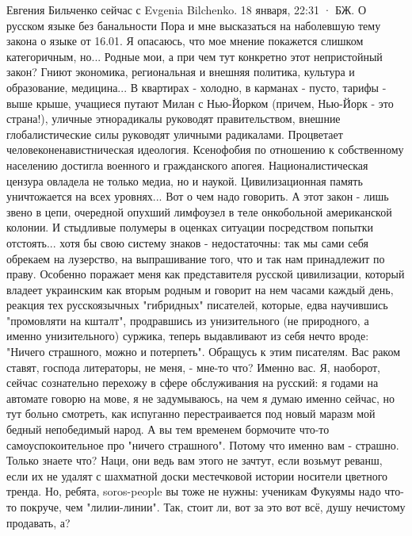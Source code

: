 \documentclass[a4paper,11pt]{extreport}
\begin{document}
Евгения Бильченко сейчас с Evgenia Bilchenko.
18 января, 22:31 ·
БЖ. О русском языке без банальности
Пора и мне высказаться на наболевшую тему закона о языке от 16.01. Я опасаюсь, что мое мнение покажется слишком категоричным, но... Родные мои, а при чем тут конкретно этот непристойный закон? Гниют экономика, региональная и внешняя политика, культура и образование, медицина... В квартирах - холодно, в карманах - пусто, тарифы - выше крыше, учащиеся путают Милан с Нью-Йорком (причем, Нью-Йорк - это страна!), уличные этнорадикалы руководят правительством, внешние глобалистические силы руководят уличными радикалами.
Процветает человеконенавистническая идеология. Ксенофобия по отношению к собственному населению достигла военного и гражданского апогея. Националистическая цензура овладела не только медиа, но и наукой. Цивилизационная память уничтожается на всех уровнях...
Вот о чем надо говорить. А этот закон - лишь звено в цепи, очередной опухший лимфоузел в теле онкобольной американской колонии. И стыдливые полумеры в оценках ситуации посредством попытки отстоять... хотя бы свою систему знаков - недостаточны: так мы сами себя обрекаем на лузерство, на выпрашивание того, что и так нам принадлежит по праву.
Особенно поражает меня как представителя русской цивилизации, который владеет украинским как вторым родным и говорит на нем часами каждый день, реакция тех русскоязычных "гибридных" писателей, которые, едва научившись "промовляти на кшталт", продравшись из унизительного (не природного, а именно унизительного) суржика, теперь выдавливают из себя нечто вроде: "Ничего страшного, можно и потерпеть".
Обращусь к этим писателям. Вас раком ставят, господа литераторы, не меня, - мне-то что? Именно вас. Я, наоборот, сейчас сознательно перехожу в сфере обслуживания на русский: я годами на автомате говорю на мове, я не задумываюсь, на чем я думаю именно сейчас, но тут больно смотреть, как испуганно перестраивается под новый маразм мой бедный непобедимый народ. А вы тем временем бормочите что-то самоуспокоительное про "ничего страшного".
Потому что именно вам - страшно. Только знаете что? Наци, они ведь вам этого не зачтут, если возьмут реванш, если их не удалят с шахматной доски местечковой истории носители цветного тренда. Но, ребята, soros-people вы тоже не нужны: ученикам Фукуямы надо что-то покруче, чем "лилии-линии". Так, стоит ли, вот за это вот всё, душу нечистому продавать, а?
\end{document}
